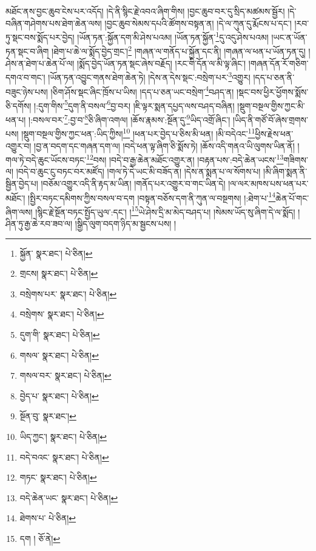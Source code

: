 མཐོང་ནས་བྱང་ཆུབ་ངེས་པར་འདོད། །དེ་ནི་སྙིང་རྗེ་འབའ་ཞིག་གིས། །བྱང་ཆུབ་བར་དུ་སྲིད་མཚམས་སྦྱོར། །དེ་བཞིན་གཤེགས་པས་ཐེག་ཆེན་ལས། །བྱང་ཆུབ་སེམས་དཔའི་ཚོགས་བསྟན་ན། །དེ་ལ་ཀུན་དུ་རྨོངས་པ་དང་། །རབ་ཏུ་སྡང་བས་སྨོད་པར་བྱེད། །ཡོན་ཏན་:སྐྱོན་དག་མི་ཤེས་པའམ། །ཡོན་ཏན་སྐྱོན་\footnote{སྐྱོན་  སྣར་ཐང་།  པེ་ཅིན། }དུ་འདུ་ཤེས་པའམ། །ཡང་ན་ཡོན་ཏན་སྡང་བ་ཞིག །ཐེག་པ་ཆེ་ལ་སྨོད་བྱེད་གྲང་།\footnote{གྲངས།  སྣར་ཐང་།  པེ་ཅིན། } །གཞན་ལ་གནོད་པ་སྐྱོན་དང་ནི། །གཞན་ལ་ཕན་པ་ཡོན་ཏན་དུ། །ཤེས་ན་ཐེག་པ་ཆེན་པོ་ལ། །སྨོད་བྱེད་ཡོན་ཏན་སྡང་ཞེས་བརྗོད། །རང་གི་དོན་ལ་མི་ལྟ་ཞིང་། །གཞན་དོན་རོ་གཅིག་དགའ་བ་གང་། །ཡོན་ཏན་འབྱུང་གནས་ཐེག་ཆེན་ཏེ། །དེས་ན་དེས་སྡང་:བསྲེག་པར་\footnote{བསྲེགས་པར་  སྣར་ཐང་།  པེ་ཅིན། }འགྱུར། །དད་པ་ཅན་ནི་བཟུང་ཉེས་པས། །ཅིག་ཤོས་སྡང་ཞིང་ཁྲོས་པ་ཡིས། །དད་པ་ཅན་ཡང་བསྲེག་\footnote{བསྲེགས་  སྣར་ཐང་།  པེ་ཅིན། }བཤད་ན། །སྡང་བས་ཕྱིར་ཕྱོགས་སྨོས་ཅི་དགོས། །:དུག་གིས་\footnote{དུག་གི་  སྣར་ཐང་།  པེ་ཅིན། }དུག་ནི་བསལ་\footnote{གསལ་  སྣར་ཐང་།  པེ་ཅིན། }བྱ་བར། །ཇི་ལྟར་སྨན་དཔྱད་ལས་བཤད་བཞིན། །སྡུག་བསྔལ་གྱིས་ཀྱང་མི་ཕན་པ། །:བསལ་བར་\footnote{གསལ་བར་  སྣར་ཐང་།  པེ་ཅིན། }:བྱ་བ་\footnote{བྱེད་པ་  སྣར་ཐང་།  པེ་ཅིན། }ཅི་ཞིག་འགལ། །ཆོས་རྣམས་:སྔོན་དུ་\footnote{སྔོན་བུ་  སྣར་ཐང་། }ཡིད་འགྲོ་ཞིང་། །ཡིད་ནི་གཙོ་བོ་ཞེས་གྲགས་པས། །སྡུག་བསྔལ་གྱིས་ཀྱང་ཕན་:ཡིད་ཀྱིས།\footnote{ཡིད་ཀྱང་།  སྣར་ཐང་།  པེ་ཅིན། } །ཕན་པར་བྱེད་པ་ཅིས་མི་ཕན། །མི་བདེའང་\footnote{བདེ་བའང་  སྣར་ཐང་།  པེ་ཅིན། }ཕྱིས་རྗེས་ཕན་འགྱུར་བ། །བྱ་ན་བདག་དང་གཞན་དག་ལ། །བདེ་ཕན་ལྟ་ཞིག་ཅི་སྨོས་ཏེ། །ཆོས་འདི་གནའ་ཡི་ལུགས་ཡིན་ནོ། །གལ་ཏེ་བདེ་ཆུང་ཡོངས་བཏང་\footnote{གཏང་  སྣར་ཐང་།  པེ་ཅིན། }བས། །བདེ་བ་རྒྱ་ཆེན་མཐོང་འགྱུར་ན། །བརྟན་པས་:བདེ་ཆེན་ཡངས་\footnote{བདེ་ཆེན་ཡང་  སྣར་ཐང་།  པེ་ཅིན། }གཟིགས་ལ། །བདེ་བ་ཆུང་ངུ་བཏང་བར་མཛོད། །གལ་ཏེ་དེ་ཡང་མི་བཟོད་ན། །དེས་ན་སྨན་པ་ལ་སོགས་པ། །མི་ཞིག་སྨན་ནི་སྦྱིན་བྱེད་པ། །བཅོམ་འགྱུར་འདི་ནི་རྟད་མ་ཡིན། །གནོད་པར་འགྱུར་བ་གང་ཡིན་དེ། །ལ་ལར་མཁས་པས་ཕན་པར་མཐོང་། །སྤྱིར་བཏང་དམིགས་ཀྱིས་བསལ་བ་དག །བསྟན་བཅོས་དག་ནི་ཀུན་ལ་བསྔགས། །:ཐེག་པ་\footnote{ཐེགས་པ་  པེ་ཅིན། }ཆེན་པོ་གང་ཞིག་ལས། །སྙིང་རྗེ་སྔོན་བཏང་སྤྱོད་ཡུལ་:དང་། །\footnote{དག །  ཅོ་ནེ། }ཡེ་ཤེས་དྲི་མ་མེད་བཤད་པ། །སེམས་ཡོད་སུ་ཞིག་དེ་ལ་སྨོད། །ཤིན་ཏུ་རྒྱ་ཆེ་རབ་ཟབ་ལ། །སྒྱིད་ལུག་བདག་ཉིད་མ་སྦྱངས་པས། །
